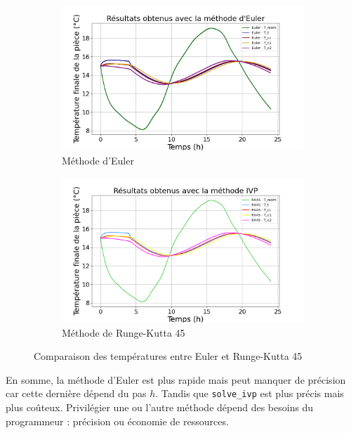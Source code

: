 \documentclass[12pt]{article}
\begin{document}
        \begin{figure}
            \centering
            \begin{subfigure}{0.48\linewidth}
                            \includegraphics[width=1\linewidth]{Rapport/figures/Euler.png}
                            \caption{Méthode d'Euler}
            \end{subfigure}
            \begin{subfigure}{0.48\linewidth}
                            \includegraphics[width=1\linewidth]{Rapport/figures/IVP.png}
                            \caption{Méthode de Runge-Kutta 45}
            \end{subfigure}
            \caption{Comparaison des températures entre Euler et Runge-Kutta 45}
            \label{fig:Comparaison}
        \end{figure}

        En somme, la méthode d'Euler est plus rapide mais peut manquer de précision car cette dernière dépend du pas $h$. Tandis que \texttt{solve\_ivp} est plus précis mais plus coûteux. Privilégier une ou l'autre méthode dépend des besoins du programmeur : précision ou économie de ressources.
        
\end{document}
